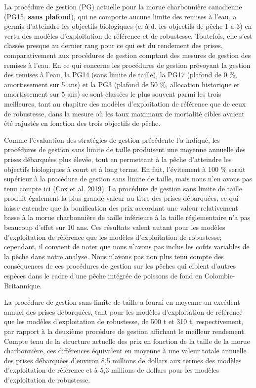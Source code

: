 \documentclass[11pt]{book}
\begin{document}
La procédure de gestion (PG) actuelle pour la morue charbonnière canadienne (PG15, \textbf{sans plafond}), qui ne comporte aucune limite des remises à l'eau, a permis d'atteindre les objectifs biologiques (c.-à-d. les objectifs de pêche 1 à 3) en vertu des modèles d'exploitation de référence et de robustesse. Toutefois, elle s'est classée presque au dernier rang pour ce qui est du rendement des prises, comparativement aux procédures de gestion comptant des mesures de gestion des remises à l'eau. En ce qui concerne les procédures de gestion prévoyant la gestion des remises à l'eau, la PG14 (sans limite de taille), la PG17 (plafond de 0 \%, amortissement sur 5 ans) et la PG3 (plafond de 50 \%, allocation historique et amortissement sur 5 ans) se sont classées le plus souvent parmi les trois meilleures, tant au chapitre des modèles d'exploitation de référence que de ceux de robustesse, dans la mesure où les taux maximaux de mortalité cibles avaient été rajustés en fonction des trois objectifs de pêche.

Comme l'évaluation des stratégies de gestion précédente l'a indiqué, les procédures de gestion sans limite de taille produisent une moyenne annuelle des prises débarquées plus élevée, tout en permettant à la pêche d'atteindre les objectifs biologiques à court et à long terme. En fait, l'évitement à 100 \% serait supérieur à la procédure de gestion sans limite de taille, mais nous n'en avons pas tenu compte ici (Cox et al. \protect\hyperlink{ref-cox2019evaluating}{2019}). La procédure de gestion sans limite de taille produit également la plus grande valeur au titre des prises débarquées, ce qui laisse entendre que la bonification des prix accordant une valeur relativement basse à la morue charbonnière de taille inférieure à la taille réglementaire n'a pas beaucoup d'effet sur 10 ans. Ces résultats valent autant pour les modèles d'exploitation de référence que les modèles d'exploitation de robustesse; cependant, il convient de noter que nous n'avons pas inclus les coûts variables de la pêche dans notre analyse. Nous n'avons pas non plus tenu compte des conséquences de ces procédures de gestion sur les pêches qui ciblent d'autres espèces dans le cadre d'une pêche intégrée de poissons de fond en Colombie-Britannique.

La procédure de gestion sans limite de taille a fourni en moyenne un excédent annuel des prises débarquées, tant pour les modèles d'exploitation de référence que les modèles d'exploitation de robustesse, de 500 t et 310 t, respectivement, par rapport à la deuxième procédure de gestion affichant le meilleur rendement. Compte tenu de la structure actuelle des prix en fonction de la taille de la morue charbonnière, ces différences équivalent en moyenne à une valeur totale annuelle des prises débarquées d'environ 8,5 millions de dollars aux termes des modèles d'exploitation de référence et à 5,3 millions de dollars pour les modèles d'exploitation de robustesse.
\end{document}
